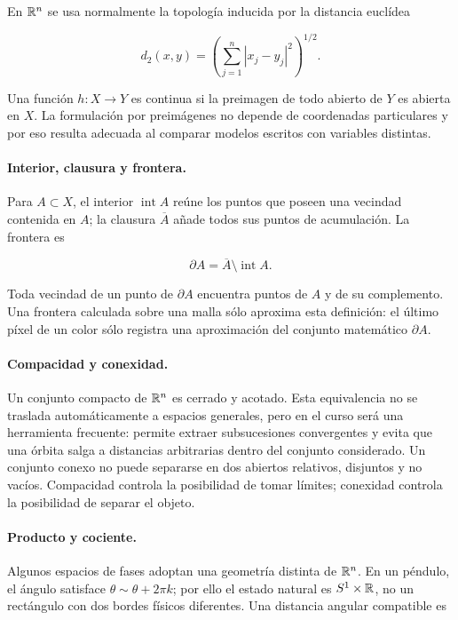 En $\mathbb{R}^n$ se usa normalmente la topología inducida por la distancia euclídea

\begin{equation}
 d_2(x,y)=\left(\sum_{j=1}^{n}|x_j-y_j|^2\right)^{1/2}.
 \label{eq:gt-metrica-euclidea}
\end{equation}

Una función $h:X\to Y$ es continua si la preimagen de todo abierto de $Y$ es abierta
en $X$. La formulación por preimágenes no depende de coordenadas particulares y por
eso resulta adecuada al comparar modelos escritos con variables distintas.

\paragraph{Interior, clausura y frontera.}
Para $A\subset X$, el interior $\operatorname{int}A$ reúne los puntos que poseen una
vecindad contenida en $A$; la clausura $\overline A$ añade todos sus puntos de
acumulación. La frontera es

\begin{equation}
 \partial A=\overline A\setminus\operatorname{int}A.
 \label{eq:gt-frontera}
\end{equation}

Toda vecindad de un punto de $\partial A$ encuentra puntos de $A$ y de su
complemento. Una frontera calculada sobre una malla sólo aproxima esta definición:
el último píxel de un color sólo registra una aproximación del conjunto matemático
$\partial A$.

\paragraph{Compacidad y conexidad.}
Un conjunto compacto de $\mathbb{R}^n$ es cerrado y acotado. Esta equivalencia no se
traslada automáticamente a espacios generales, pero en el curso será una herramienta
frecuente: permite extraer subsucesiones convergentes y evita que una órbita salga a
distancias arbitrarias dentro del conjunto considerado. Un conjunto conexo no puede
separarse en dos abiertos relativos, disjuntos y no vacíos. Compacidad controla la
posibilidad de tomar límites; conexidad controla la posibilidad de separar el objeto.

\paragraph{Producto y cociente.}
Algunos espacios de fases adoptan una geometría distinta de $\mathbb{R}^n$. En un péndulo, el ángulo satisface
$\theta\sim\theta+2\pi k$; por ello el estado natural es
$S^1\times\mathbb{R}$, no un rectángulo con dos bordes físicos diferentes. Una distancia
angular compatible es

